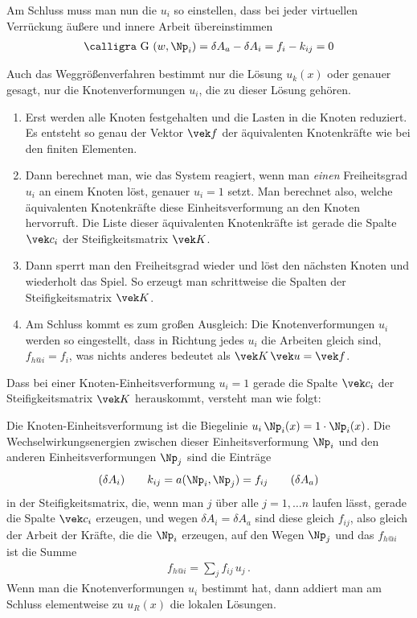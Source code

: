 {Am Schluss muss man nun die $u_i$ so einstellen, dass bei jeder virtuellen Verr\"{u}ckung \"{a}u{\ss}ere und innere Arbeit \"{u}bereinstimmen
\begin{align}
\text{\normalfont\calligra G\,\,}(w,\Np_i) = \delta A_a - \delta A_i = f_i - k_{ij} = 0
\end{align}

Auch das Weggr\"{o}{\ss}enverfahren bestimmt nur die L\"{o}sung $u_k(x)$ oder genauer gesagt, nur die Knotenverformungen $u_i$, die zu dieser L\"{o}sung geh\"{o}ren.\\

\begin{enumerate}
  \item Erst werden alle Knoten festgehalten und die Lasten in die Knoten reduziert. Es entsteht so genau der Vektor $\vek f$ der \"{a}quivalenten Knotenkr\"{a}fte wie bei den finiten Elementen.
  \item Dann berechnet man, wie das System reagiert, wenn man {\em einen\/} Freiheitsgrad $u_i$ an einem Knoten l\"{o}st, genauer $u_i = 1$ setzt. Man berechnet also, welche \"{a}quivalenten Knotenkr\"{a}fte diese Einheitsverformung an den Knoten hervorruft. Die Liste dieser \"{a}quivalenten Knotenkr\"{a}fte ist gerade die Spalte $\vek c_i$ der Steifigkeitsmatrix $\vek K$.
  \item Dann sperrt man den Freiheitsgrad wieder und l\"{o}st den n\"{a}chsten Knoten und wiederholt das Spiel. So erzeugt man schrittweise die Spalten der Steifigkeitsmatrix $\vek K$.
  \item Am Schluss kommt es zum gro{\ss}en Ausgleich: Die Knotenverformungen $u_i$ werden so eingestellt, dass in Richtung jedes $u_i$ die Arbeiten gleich sind, $f_{h @i} = f_i$, was nichts anderes bedeutet als $\vek K\,\vek u = \vek f$.
\end{enumerate}

Dass bei einer Knoten-Einheitsverformung $u_i = 1$ gerade die Spalte $\vek c_i$ der Steifigkeitsmatrix $\vek K$ herauskommt, versteht man wie folgt:

Die Knoten-Einheitsverformung ist die Biegelinie $u_i\,\Np_i(x) = 1 \cdot \Np_i(x)$. Die Wechselwirkungsenergien zwischen dieser Einheitsverformung $\Np_i$ und den anderen Einheitsverformungen $\Np_j$ sind die Eintr\"{a}ge
\begin{align}
\text{($\delta A_i$)} \qquad k_{ij} = a(\Np_i,\Np_j) = f_{ij} \qquad \text{($\delta A_a$)}
\end{align}
in der Steifigkeitsmatrix, die, wenn man $j$ \"{u}ber alle $j = 1, \ldots n$ laufen l\"{a}sst, gerade die Spalte $\vek c_i$ erzeugen, und wegen $\delta A_i = \delta A_a$ sind diese gleich $f_{ij}$, also gleich der Arbeit der Kr\"{a}fte, die die $\Np_i$ erzeugen, auf den Wegen $\Np_j$ und das $f_{h @i}$ ist die Summe
\begin{align}
f_{h @i} = \sum_j f_{ij}\,u_j\,.
\end{align}
Wenn man die Knotenverformungen $u_i$ bestimmt hat, dann addiert man am Schluss elementweise zu $u_R(x)$ die lokalen L\"{o}sungen.

}
